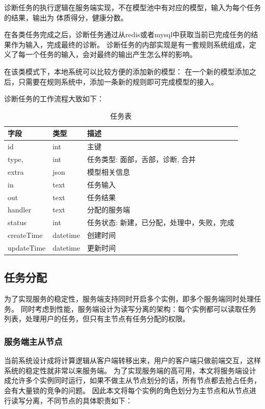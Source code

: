 
诊断任务的执行逻辑在服务端实现，不在模型池中有对应的模型，输入为每个任务的结果，输出为 体质得分，健康分数。

在各类任务完成之后，诊断任务通过从redis或者mysql中获取当前已完成任务的结果作为输入，完成最终的诊断。 
诊断任务的内部实现是有一套规则系统组成，定义了每一个任务的输入，会对最终的输出产生怎么样的影响。

在该类模式下，本地系统可以比较方便的添加新的模型： 在一个新的模型添加之后，只需要在规则系统中，添加一条新的规则即可完成模型的接入。

诊断任务的工作流程大致如下：

\begin{table}[]
    \centering
    \begin{tabular}{lll}
        \toprule
        字段 & 类型 & 描述 \\ 
        \midrule
        id & int & 主键 \\
        type, & int & 任务类型: 面部，舌部，诊断, 合并 \\ 
        extra & json & 模型相关信息 \\
        in & text & 任务输入 \\
        out & text & 任务结果 \\
        handler & text & 分配的服务端 \\
        status & int & 任务状态: 新建，已分配，处理中，失败，完成 \\
        createTime & datetime & 创建时间 \\
        updateTime & datetime & 更新时间\\
        \bottomrule
    \end{tabular}
    \caption{任务表}
    \label{tab:task}
\end{table}

\subsection{任务分配}
为了实现服务的稳定性，服务端支持同时开启多个实例，即多个服务端同时处理任务。
同时考虑到性能，服务端设计为读写分离的架构：每个实例都可以读取任务列表，处理用户的任务，但只有主节点有任务分配的权限。


\subsubsection{服务端主从节点}
当前系统设计成将计算逻辑从客户端转移出来，用户的客户端只做前端交互，这样系统的稳定性就非常以来服务端。
为了实现服务端的高可用，本文将服务端设计成允许多个实例同时运行，如果不做主从节点划分的话，所有节点都去抢占任务，会有大量锁的竞争的问题。
因此本文将每个实例的角色划分为主节点和从节点进行读写分离，不同节点的具体职责如下：


